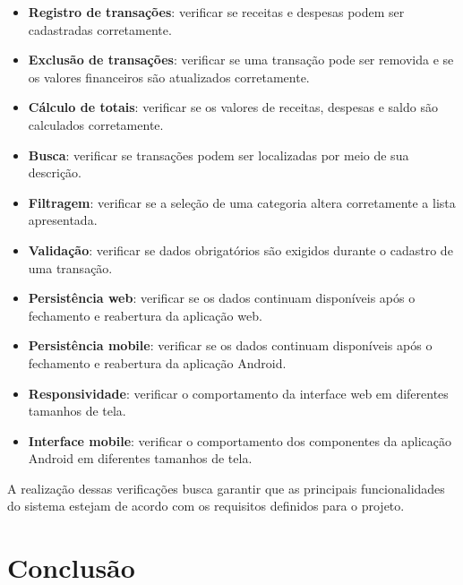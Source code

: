 \documentclass[12pt,a4paper]{article}
\begin{document}
\begin{itemize}
    \item \textbf{Registro de transações}: verificar se receitas e despesas podem ser cadastradas corretamente.
    
    \item \textbf{Exclusão de transações}: verificar se uma transação pode ser removida e se os valores financeiros são atualizados corretamente.
    
    \item \textbf{Cálculo de totais}: verificar se os valores de receitas, despesas e saldo são calculados corretamente.
    
    \item \textbf{Busca}: verificar se transações podem ser localizadas por meio de sua descrição.
    
    \item \textbf{Filtragem}: verificar se a seleção de uma categoria altera corretamente a lista apresentada.
    
    \item \textbf{Validação}: verificar se dados obrigatórios são exigidos durante o cadastro de uma transação.
    
    \item \textbf{Persistência web}: verificar se os dados continuam disponíveis após o fechamento e reabertura da aplicação web.
    
    \item \textbf{Persistência mobile}: verificar se os dados continuam disponíveis após o fechamento e reabertura da aplicação Android.
    
    \item \textbf{Responsividade}: verificar o comportamento da interface web em diferentes tamanhos de tela.
    
    \item \textbf{Interface mobile}: verificar o comportamento dos componentes da aplicação Android em diferentes tamanhos de tela.
\end{itemize}

A realização dessas verificações busca garantir que as principais funcionalidades do sistema estejam de acordo com os requisitos definidos para o projeto.

\section{Conclusão}
\end{document}
